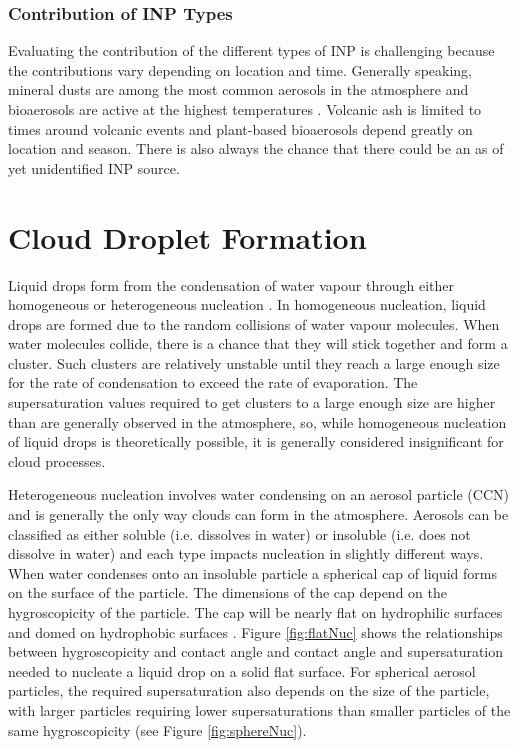 \subsubsection{Contribution of INP Types}
Evaluating the contribution of the different types of INP is challenging because the contributions vary depending on location and time. Generally speaking, mineral dusts are among the most common aerosols in the atmosphere and bioaerosols are active at the highest temperatures \citep{mur2012}. Volcanic ash is limited to times around volcanic events and plant-based bioaerosols depend greatly on location and season. There is also always the chance that there could be an as of yet unidentified INP source.

\section{Cloud Droplet Formation} \label{ch:act}
Liquid drops form from the condensation of water vapour through either homogeneous or heterogeneous nucleation \citep{rog1989,lamb2011}. In homogeneous nucleation, liquid drops are formed due to the random collisions of water vapour molecules. When water molecules collide, there is a chance that they will stick together and form a cluster. Such clusters are relatively unstable until they reach a large enough size for the rate of condensation to exceed the rate of evaporation. The supersaturation values required to get clusters to a large enough size are higher than are generally observed in the atmosphere, so, while homogeneous nucleation of liquid drops is theoretically possible, it is generally considered insignificant for cloud processes. \citep{mcdo1958, rog1989, lamb2011}

Heterogeneous nucleation involves water condensing on an aerosol particle (CCN) and is generally the only way clouds can form in the atmosphere. Aerosols can be classified as either soluble (i.e. dissolves in water) or insoluble (i.e. does not dissolve in water) and each type impacts nucleation in slightly different ways. When water condenses onto an insoluble particle a spherical cap of liquid forms on the surface of the particle. The dimensions of the cap depend on the hygroscopicity of the particle. The cap will be nearly flat on hydrophilic surfaces and domed on hydrophobic surfaces \citep{lamb2011}. Figure \ref{fig:flatNuc} shows the relationships between hygroscopicity and contact angle and contact angle and supersaturation needed to nucleate a liquid drop on a solid flat surface. For spherical aerosol particles, the required supersaturation also depends on the size of the particle, with larger particles requiring lower supersaturations than smaller particles of the same hygroscopicity (see Figure \ref{fig:sphereNuc}).

